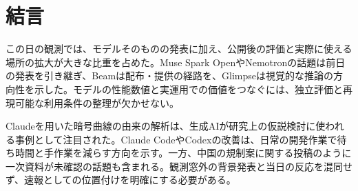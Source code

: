 \section*{結言}
この日の観測では、モデルそのものの発表に加え、公開後の評価と実際に使える場所の拡大が大きな比重を占めた。Muse Spark OpenやNemotronの話題は前日の発表を引き継ぎ、Beamは配布・提供の経路を、Glimpseは視覚的な推論の方向性を示した。モデルの性能数値と実運用での価値をつなぐには、独立評価と再現可能な利用条件の整理が欠かせない。

Claudeを用いた暗号曲線の由来の解析は、生成AIが研究上の仮説検討に使われる事例として注目された。Claude CodeやCodexの改善は、日常の開発作業で待ち時間と手作業を減らす方向を示す。一方、中国の規制案に関する投稿のように一次資料が未確認の話題も含まれる。観測窓外の背景発表と当日の反応を混同せず、速報としての位置付けを明確にする必要がある。
